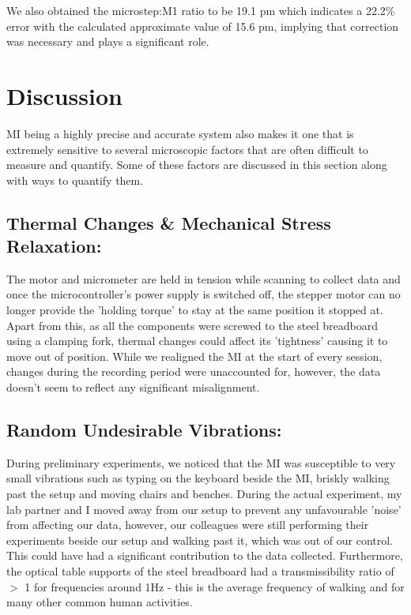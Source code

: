 \documentclass[journal]{Imperial_lab_report}
\begin{document}

We also obtained the microstep:M1 ratio to be 19.1 pm which indicates a 22.2\% error with the calculated approximate value of 15.6 pm, implying that correction was necessary and plays a significant role.

\section{Discussion}
 MI being a highly precise and accurate system also makes it one that is extremely sensitive to several microscopic factors that are often difficult to measure and quantify. Some of these factors are discussed in this section along with ways to quantify them. 
\vspace{-10pt}

\subsection{Thermal Changes \& Mechanical Stress Relaxation:}
The motor and micrometer are held in tension while scanning to collect data and once the microcontroller's power supply is switched off, the stepper motor can no longer provide the 'holding torque' to stay at the same position it stopped at. Apart from this, as all the components were screwed to the steel breadboard using a clamping fork, thermal changes could affect its 'tightness' causing it to move out of position. While we realigned the MI at the start of every session, changes during the recording period were unaccounted for, however, the data doesn't seem to reflect any significant misalignment.
\vspace{-18pt}

\subsection{Random Undesirable Vibrations:}
During preliminary experiments, we noticed that the MI was susceptible to very small vibrations such as typing on the keyboard beside the MI, briskly walking past the setup and moving chairs and benches. During the actual experiment, my lab partner and I moved away from our setup to prevent any unfavourable 'noise' from affecting our data, however, our colleagues were still performing their experiments beside our setup and walking past it, which was out of our control. This could have had a significant contribution to the data collected. Furthermore, the optical table supports of the steel breadboard had a transmissibility ratio of $>$ 1 for frequencies around 1Hz \cite{optical_table_supports} - this is the average frequency of walking and for many other common human activities. 
\end{document}
